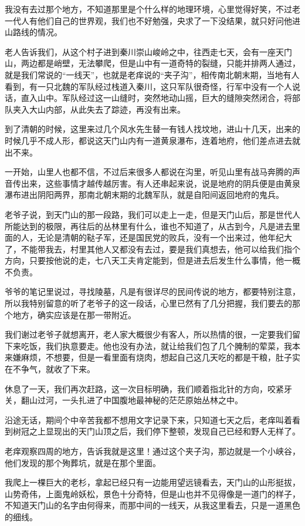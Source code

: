 我没有去过那个地方，不知道那里是个什么样的地理环境，心里觉得好笑，不过老一代人有他们自己的世界观，我们也不好勉强，央求了一下没结果，就只好问他进山路线的情况。

老人告诉我们，从这个村子进到秦川崇山峻岭之中，往西走七天，会有一座天门山，两边都是峭壁，无法攀爬，但是山中有一道奇特的裂缝，只能并排两人通过，就是我们常说的“一线天”，也就是老痒说的“夹子沟”，相传南北朝末期，当地有人看到，有一只北魏的军队经过栈道入秦川，这只军队很奇怪，行军中没有一个人说话，直入山中。军队经过这一山缝时，突然地动山摇，巨大的缝隙突然闭合，将部队夹入大山内部，从此失去了踪迹，再没有出来。

到了清朝的时候，这里来过几个风水先生替一有钱人找坟地，进山十几天，出来的时候几乎不成人形，都说这天门山内有一道黄泉瀑布，连着地府，他们差点进去就出不来。

一开始，山里人也都不信，不过后来很多人都说在沟里，听见山里有战马奔腾的声音传出来，这些事情才越传越厉害。有人还串起来说，说是地府的阴兵便是由黄泉瀑布进出阴阳两界，那南北朝末期的北魏军队，就是自阳间返回地府的鬼兵。

老爷子说，到天门山的那一段路，我们可以走上一走，但是天门山后，那是世代人所能达到的极限，再往后的丛林里有什么，谁也不知道了，从古到今，凡是进去里面的人，无论是清朝的鞑子军，还是国民党的败兵，没有一个出来过，他年纪大了，不能带我去，村里其他人又都没有去过，要是我们真想去，他可以给我们指个方向，只要按他说的走，七八天工夫肯定能到，但是进去后发生什么事情，他一概不负责。

爷爷的笔记里说过，寻找陵墓，凡是有很详尽的民间传说的地方，都要特别注意，所以我特别留意的听了老爷子的这一段话，心里已然有了几分把握，我们要去的那个地方，确实应该是在那一带附近。

我们谢过老爷子就想离开，老人家大概很少有客人，所以热情的很，一定要我们留下来吃饭，我们执意要走。他也没有办法，就让给我们包了几个腌制的荤菜，我本来嫌麻烦，不想要，但是一看里面有烧肉，想起自己这几天吃的都是干粮，肚子实在不争气，就收了下来。

休息了一天，我们再次赶路，这一次目标明确，我们顺着指北针的方向，咬紧牙关，翻山过河，一头扎进了中国腹地最神秘的茫茫原始丛林之中。

沿途无话，期间个中辛苦我都不想用文字记录下来，只知道七天之后，老痒叫着看到树冠之上显现出的天门山顶之后，我们停下整顿，发现自己已经和野人无样了。

老痒观察四周的地方，告诉我就是这里！通过这个夹子沟，那边就是一个小峡谷，他们发现的那个殉葬坑，就是在那个里面。

我爬上一棵巨大的老杉，拿起已经只有一边能用望远镜看去，天门山的山形挺拔，山势奇伟，上面鬼岭妖松，景色十分奇特，但是山也并不见得像是一道门的样子，不知道天门山的名字由何得来，而那中间的一线天，从我这里看去，只是一道黑色的细线。

